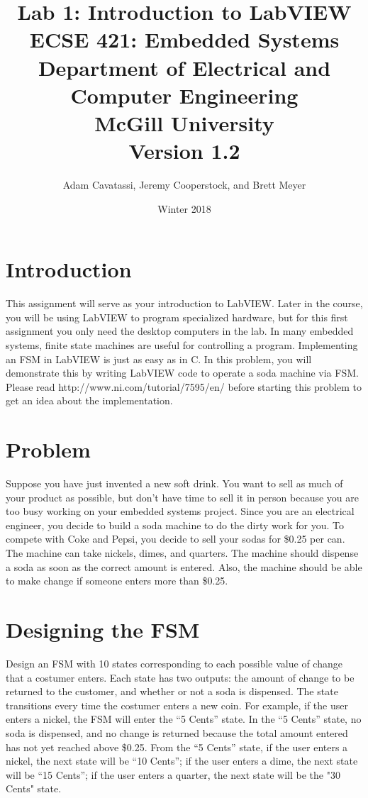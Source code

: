 \documentclass{article}
\title{Lab 1: Introduction to LabVIEW \\
  \large ECSE 421: Embedded Systems \\ Department of Electrical and Computer Engineering \\ McGill University \\ Version 1.2}
\author{Adam Cavatassi, Jeremy Cooperstock, and Brett Meyer}
\date{Winter 2018}
\begin{document}
\maketitle

\section*{Introduction}
This assignment will serve as your introduction to LabVIEW. Later in the course, you will be
using LabVIEW to program specialized hardware, but for this first assignment you only need
the desktop computers in the lab. In many embedded systems, finite state machines are useful for controlling a program.
Implementing an FSM in LabVIEW is just as easy as in C. In this problem, you will
demonstrate this by writing LabVIEW code to operate a soda machine via FSM. Please read
http://www.ni.com/tutorial/7595/en/ before starting this problem to get an idea about the
implementation.

\section*{Problem}

Suppose you have just invented a new soft drink. You want to sell as much of your product
as possible, but don’t have time to sell it in person because you are too busy working on your
embedded systems project. Since you are an electrical engineer, you decide to build a soda
machine to do the dirty work for you. To compete with Coke and Pepsi, you decide to sell
your sodas for \$0.25 per can. The machine can take nickels, dimes, and quarters. The
machine should dispense a soda as soon as the correct amount is entered. Also, the machine
should be able to make change if someone enters more than \$0.25.

\section*{Designing the FSM}
Design an FSM with 10 states corresponding to each possible value of change that a costumer
enters. Each state has two outputs: the amount of change to be returned to the customer,
and whether or not a soda is dispensed. The state transitions every time the costumer enters
a new coin.
For example, if the user enters a nickel, the FSM will enter the “5 Cents” state. In the “5 Cents”
state, no soda is dispensed, and no change is returned because the total amount entered has not yet reached above \$0.25. From the “5 Cents” state, if the user enters a nickel, the next state will be “10 Cents”; if the user enters a dime, the next state will be “15 Cents”; if the user enters a quarter, the next state will be the "30 Cents" state.
\end{document}
